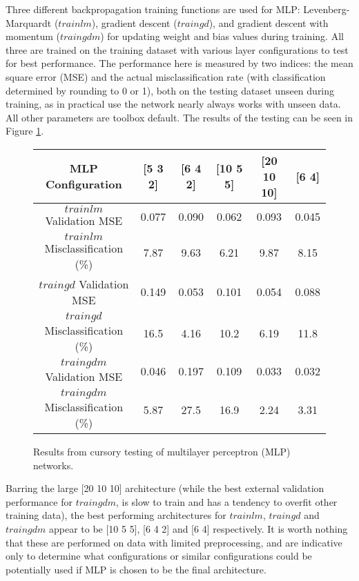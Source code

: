 \documentclass[10pt, oneside]{article}
\begin{document}
Three different backpropagation training functions are used for MLP: Levenberg-Marquardt ($trainlm$), gradient descent ($traingd$), and gradient descent with momentum ($traingdm$) for updating weight and bias values during training. All three are trained on the training dataset with various layer configurations to test for best performance. The performance here is measured by two indices: the mean square error (MSE) and the actual misclassification rate (with classification determined by rounding to 0 or 1), both on the testing dataset unseen during training, as in practical use the network nearly always works with unseen data. All other parameters are toolbox default. The results of the testing can be seen in Figure \ref{fig:mlp-testing}.

\begin{figure}[h]
\begin{center}
\fontsize{9}{11}\selectfont
\begin{tabular}{|c|c|c|c|c|c|}
\hline 
MLP Configuration & [5 3 2] & [6 4 2] & [10 5 5] & [20 10 10] & [6 4] \\ \hline \hline 
$trainlm$ Validation MSE & 0.077 & 0.090 & 0.062 & 0.093 & 0.045 \\ \hline 
$trainlm$ Misclassification (\%) & 7.87 & 9.63 & 6.21 & 9.87 & 8.15 \\ \hline \hline 
$traingd$ Validation MSE & 0.149 & 0.053 & 0.101 & 0.054 & 0.088 \\ \hline 
$traingd$ Misclassification (\%) & 16.5 & 4.16 & 10.2 & 6.19 & 11.8 \\ \hline \hline 
$traingdm$ Validation MSE & 0.046 & 0.197 & 0.109 & 0.033 & 0.032 \\ \hline 
$traingdm$ Misclassification (\%) & 5.87 & 27.5 & 16.9 & 2.24 & 3.31 \\ \hline 
\end{tabular}
\end{center}
\caption{\label{fig:mlp-testing} Results from cursory testing of multilayer perceptron (MLP) networks.}
\end{figure}

Barring the large [20 10 10] architecture (while the best external validation performance for $traingdm$, is slow to train and has a tendency to overfit other training data), the best performing architectures for $trainlm$, $traingd$ and $traingdm$ appear to be [10 5 5], [6 4 2] and [6 4] respectively. It is worth nothing that these are performed on data with limited preprocessing, and are indicative only to determine what configurations or similar configurations could be potentially used if MLP is chosen to be the final architecture.
\end{document}
